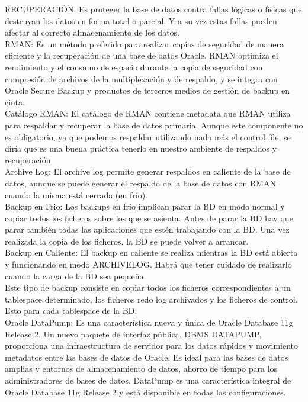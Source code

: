 \documentclass[12pt,letterpaper]{article}
\begin{document}
 RECUPERACIÓN: Es proteger la base de datos contra fallas lógicas o físicas que destruyan los datos en forma total o parcial. Y a su vez estas fallas pueden afectar al correcto almacenamiento de los datos.\\

 RMAN: Es un método preferido para realizar copias de seguridad de manera eficiente y la recuperación de una base de datos Oracle. RMAN optimiza el rendimiento y el consumo de espacio durante la copia de seguridad con compresión de archivos de la multiplexación y de respaldo, y se integra con Oracle Secure Backup y productos de terceros medios de gestión de backup en cinta.\\

 Catálogo RMAN: El catálogo de RMAN contiene metadata que RMAN utiliza para respaldar y recuperar la base de datos primaria. Aunque este componente no es obligatorio, ya que podemos respaldar utilizando nada más el control file, se diría que es una buena práctica tenerlo en nuestro ambiente de respaldos y recuperación.\\

 Archive Log: El archive log permite generar respaldos en caliente de la base de datos, aunque se puede generar el respaldo de la base de datos con RMAN cuando la misma está cerrada (en frío).\\

 Backup en Frio: Los backups en frio implican parar la BD en modo normal y copiar todos los ficheros sobre los que se asienta. Antes de parar la BD hay que parar también todas las aplicaciones que estén trabajando con la BD. Una vez realizada la copia de los ficheros, la BD se puede volver a arrancar.\\

 Backup en Caliente: El backup en caliente se realiza mientras la BD está abierta y funcionando en modo ARCHIVELOG. Habrá que tener cuidado de realizarlo cuando la carga de la BD sea pequeña.\\

Este tipo de backup consiste en copiar todos los ficheros correspondientes a un tablespace determinado, los ficheros redo log archivados y los ficheros de control. Esto para cada tablespace de la BD.\\

 Oracle DataPump: Es una característica nueva y única de Oracle Database 11g Release 2. Un nuevo paquete de interfaz pública, DBMS DATAPUMP, proporciona una infraestructura de servidor para los datos rápidos y movimiento metadatos entre las bases de datos de Oracle. Es ideal para las bases de datos amplias y entornos de almacenamiento de datos, ahorro de tiempo para los administradores de bases de datos. DataPump es una característica integral de Oracle Database 11g Release 2 y está disponible en todas las configuraciones.\\
\end{document}

